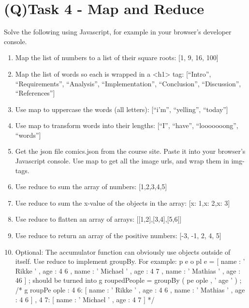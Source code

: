 \documentclass[a4paper,12pt]{article}
\begin{document}
\section{(Q)Task 4 - Map and Reduce}
Solve the following using Javascript, for example in your browser’s developer console.\\
\begin{enumerate}
\item Map the list of numbers to a list of their square roots: [1, 9, 16, 100]
\item Map the list of words so each is wrapped in a <h1> tag: [“Intro”, “Requirements”, “Analysis”, “Implementation”, “Conclusion”, “Discussion”,
“References”]
\item Use map to uppercase the words (all letters): [“i’m”, “yelling”, “today”]
\item Use map to transform words into their lengths: [“I”, “have”, “looooooong”,
“words”]
\item Get the json file comics.json from the course site. Paste it into your
browser’s Javascript console. Use map to get all the image urls, and wrap
them in img-tags.
\item Use reduce to sum the array of numbers: [1,2,3,4,5]
\item Use reduce to sum the x-value of the objects in the array: [{x: 1},{x:
2},{x: 3}]
\item Use reduce to flatten an array of arrays: [[1,2],[3,4],[5,6]]
\item Use reduce to return an array of the positive numbers: [-3, -1, 2, 4, 5]
\item Optional: The accumulator function can obviously use objects outside of
itself. Use reduce to implement groupBy. For example:
p e o pl e = [
{name : ’ Rikke ’ , age : 4 6} ,
{name : ’ Michael ’ , age : 4 7} ,
{name : ’ Mathias ’ , age : 46}
] ;
should be turned into
g roupedPeople = groupBy ( pe ople , ’ age ’ ) ;
/*
g roupPe ople :
{
4 6: [
{name : ’ Rikke ’ , age : 4 6 } ,
{name : ’ Mathias ’ , age : 4 6 }
] ,
4 7: [
{name : ’ Michael ’ , age : 4 7 }
]
}
*/

\end{enumerate}
\end{document}
